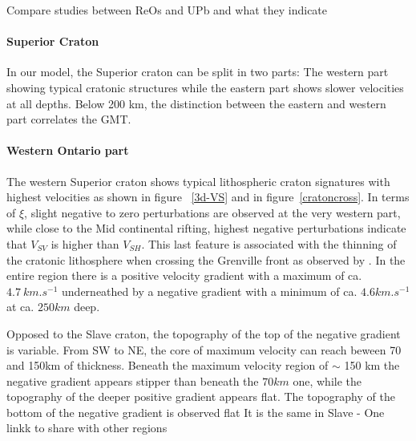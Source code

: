 \documentclass[12pt]{article}
\begin{document}

	Compare studies between ReOs and UPb and what they indicate
		\paragraph{Superior Craton}
			In our model, the Superior craton can be split in two parts: The western part showing typical cratonic structures while the eastern part shows slower velocities at all depths. Below 200 km, the distinction between the eastern and western part correlates the GMT. 

		\paragraph{Western Ontario part}
			The western Superior craton shows typical lithospheric craton signatures with highest velocities as shown in figure ~\ref{3d-VS} and in figure~\ref{cratoncross}. In terms of $\xi$, slight negative to zero perturbations are observed at the very western part, while close to the Mid continental rifting, highest negative perturbations indicate that $V_{SV}$ is higher than $V_{SH}$. This last feature is associated with the thinning of the cratonic lithosphere when crossing the Grenville front as observed by \cite{darbyshire2007new}.
			In the entire region there is a positive velocity gradient with a maximum of ca. $4.7 \: km.s^{-1}$ underneathed by a negative gradient  with a minimum of ca. $4.6km.s^{-1}$ at ca. $250km$ deep.
% 
			
			Opposed to the Slave craton, the topography of the top of the negative gradient is variable. 
			From SW to NE, the core of maximum velocity can reach beween 70 and 150km of thickness. 
			Beneath the maximum velocity region of  $\sim$ 150 km the negative gradient appears stipper than beneath the $70km$ one, while the topography of the deeper positive gradient appears flat. The topography of the bottom of the negative gradient is observed flat {\color{red} It is the same in Slave - One linkk to share with other regions}
			 
\end{document}
